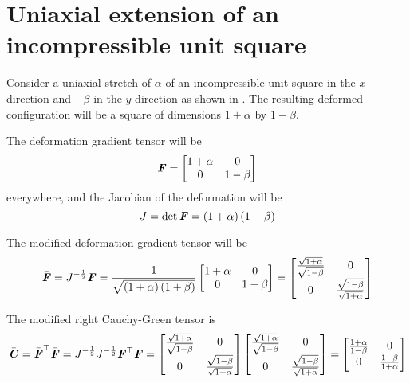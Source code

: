 \clearemptydoublepage

\section{Uniaxial extension of an incompressible unit square}

Consider a uniaxial stretch of $\alpha$ of an incompressible unit
square in the $x$ direction and $-\beta$ in the $y$ direction as shown
in . The resulting deformed
configuration will be a square of dimensions $1+\alpha$ by $1-\beta$.


The deformation gradient tensor will be
\begin{equation}
  \boldsymbol{\mathit{F}}= \begin{bmatrix}
    1+\alpha & 0  \\
    0 & 1-\beta
  \end{bmatrix}
\end{equation}
everywhere, and the Jacobian of the deformation will be 
\begin{equation}
  J = \det \boldsymbol{\mathit{F}}=\left( 1+\alpha \right)\left( 1-\beta \right)
\end{equation}

The modified deformation gradient tensor will be
\begin{equation}
  \bar{\boldsymbol{\mathit{F}}}=J^{-\frac{1}{2}}\boldsymbol{\mathit{F}}=\frac{1}{\sqrt{\left( 1+\alpha \right)\left( 1+\beta \right)}}\begin{bmatrix}
    1+\alpha & 0  \\
    0 & 1-\beta
  \end{bmatrix}=\begin{bmatrix}
    \frac{\sqrt{1+\alpha}}{\sqrt{1-\beta}} & 0  \\
    0 & \frac{\sqrt{1-\beta}}{\sqrt{1+\alpha}}
  \end{bmatrix}
\end{equation}

The modified right Cauchy-Green tensor is
\begin{equation}
  \bar{\boldsymbol{\mathit{C}}} =  {\bar{\boldsymbol{\mathit{F}}}}^{ \top } \bar{\boldsymbol{\mathit{F}}} =
  J^{-\frac{1}{2}}J^{-\frac{1}{2}} {\boldsymbol{\mathit{F}}}^{ \top } \boldsymbol{\mathit{F}} =
  \begin{bmatrix}
    \frac{\sqrt{1+\alpha}}{\sqrt{1-\beta}} & 0  \\
    0 & \frac{\sqrt{1-\beta}}{\sqrt{1+\alpha}}
  \end{bmatrix} \begin{bmatrix}
    \frac{\sqrt{1+\alpha}}{\sqrt{1-\beta}} & 0  \\
    0 & \frac{\sqrt{1-\beta}}{\sqrt{1+\alpha}}
  \end{bmatrix}=\begin{bmatrix}
    \frac{1+\alpha}{1-\beta} & 0  \\
    0 & \frac{1-\beta}{1+\alpha}
  \end{bmatrix}
\end{equation}


